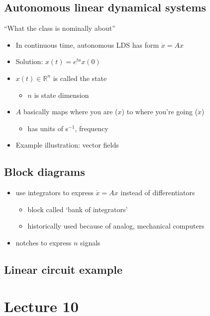 \documentclass[10pt,letterpaper]{article}
\begin{document}
\subsection{Autonomous linear dynamical systems}
\label{sec-7_2}

``What the class is nominally about''
\begin{itemize}
\item In continuous time, autonomous LDS has form $\dot x = Ax$
\item Solution: $x(t) = e ^{ta} x(0)$
\item $x(t) \in \mathbb{R}^{n}$ is called the state

\begin{itemize}
\item $n$ is state dimension
\end{itemize}

\item $A$ basically maps where you are ($x$) to where you're going ($\dot x$)

\begin{itemize}
\item has units of s$^{-1}$, frequency
\end{itemize}

\item Example illustration: vector fields
\end{itemize}
\subsection{Block diagrams}
\label{sec-7_3}

\begin{itemize}
\item use integrators to express $\dot x =Ax$ instead of differentiators

\begin{itemize}
\item block called `bank of integrators'
\item historically used because of analog, mechanical computers
\end{itemize}

\item notches to express $n$ signals
\end{itemize}
\subsection{Linear circuit example}
\label{sec-7_4}
\section{Lecture 10}
\label{sec-8}
\end{document}
